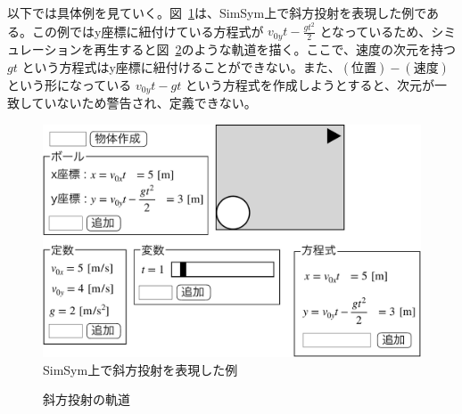 \documentclass[11pt, a4paper, oneside, twocolumn, dvipdfmx]{jsarticle}
\newcommand{\simname}{SimSym}
\begin{document}
以下では具体例を見ていく。図~\ref{simsym_fig1}は、\simname 上で斜方投射を表現した例である。この例ではy座標に紐付けている方程式が $v_{0y}t - \frac{gt^2}{2}$ となっているため、シミュレーションを再生すると図~\ref{correct}のような軌道を描く。ここで、速度の次元を持つ $gt$ という方程式はy座標に紐付けることができない。また、$(\text{位置}) - (\text{速度})$ という形になっている $v_{0y}t - gt$ という方程式を作成しようとすると、次元が一致していないため警告され、定義できない。

\begin{figure}[htb]
  \centering
  \includegraphics*[width=0.9\linewidth]{work/slide_img4-crop.pdf}
  \caption{\simname 上で斜方投射を表現した例} \label{simsym_fig1}
\end{figure}

\begin{figure}[htb]
\centering
\begin{minipage}{0.8\linewidth}
\centering
{}
\caption{斜方投射の軌道} \label{correct}
\end{minipage}
\end{figure}
\end{document}
